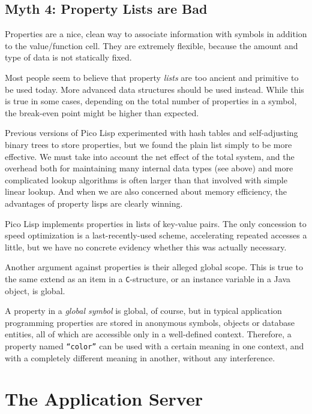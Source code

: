 \subsection{Myth 4: Property Lists are Bad}
\label{sec:rad-myth-prop-list}
Properties are a nice, clean way to associate information with symbols in
addition to the value/function cell. They are extremely flexible, because the
amount and type of data is not statically fixed.

Most people seem to believe that property \emph{lists} are too ancient and
primitive to be used today. More advanced data structures should be used
instead. While this is true in some cases, depending on the total number of
properties in a symbol, the break-even point might be higher than expected.

Previous versions of Pico Lisp experimented with hash tables and self-adjusting
binary trees to store properties, but we found the plain list simply to be more
effective. We must take into account the net effect of the total system, and the
overhead both for maintaining many internal data types (see above) and more
complicated lookup algorithms is often larger than that involved with simple
linear lookup. And when we are also concerned about memory efficiency, the
advantages of property lisps are clearly winning.

Pico Lisp implements properties in lists of key-value pairs. The only concession
to speed optimization is a last-recently-used scheme, accelerating repeated
accesses a little, but we have no concrete evidency whether this was actually
necessary.

Another argument against properties is their alleged global scope. This is true
to the same extend as an item in a \texttt{C}-structure, or an instance variable
in a Java object, is global.

A property in a \emph{global symbol} is global, of course, but in typical
application programming properties are stored in anonymous symbols, objects or
database entities, all of which are accessible only in a well-defined context.
Therefore, a property named \texttt{``color''} can be used with a certain
meaning in one context, and with a completely different meaning in another,
without any interference.


\section{The Application Server}
\label{sec:rad-application-server}

